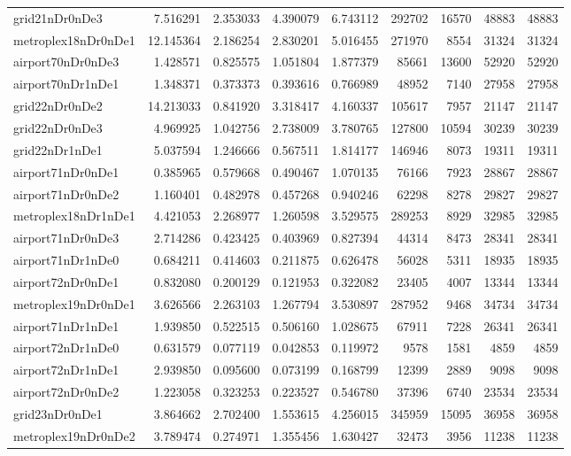\begin{longtable}{|l|r|r|r|r|r|r|r|r|}
grid21nDr0nDe3 & 7.516291 & 2.353033 & 4.390079 & 6.743112 & 292702 & 16570 & 48883 & 48883 \\
metroplex18nDr0nDe1 & 12.145364 & 2.186254 & 2.830201 & 5.016455 & 271970 & 8554 & 31324 & 31324 \\
airport70nDr0nDe3 & 1.428571 & 0.825575 & 1.051804 & 1.877379 & 85661 & 13600 & 52920 & 52920 \\
airport70nDr1nDe1 & 1.348371 & 0.373373 & 0.393616 & 0.766989 & 48952 & 7140 & 27958 & 27958 \\
grid22nDr0nDe2 & 14.213033 & 0.841920 & 3.318417 & 4.160337 & 105617 & 7957 & 21147 & 21147 \\
grid22nDr0nDe3 & 4.969925 & 1.042756 & 2.738009 & 3.780765 & 127800 & 10594 & 30239 & 30239 \\
grid22nDr1nDe1 & 5.037594 & 1.246666 & 0.567511 & 1.814177 & 146946 & 8073 & 19311 & 19311 \\
airport71nDr0nDe1 & 0.385965 & 0.579668 & 0.490467 & 1.070135 & 76166 & 7923 & 28867 & 28867 \\
airport71nDr0nDe2 & 1.160401 & 0.482978 & 0.457268 & 0.940246 & 62298 & 8278 & 29827 & 29827 \\
metroplex18nDr1nDe1 & 4.421053 & 2.268977 & 1.260598 & 3.529575 & 289253 & 8929 & 32985 & 32985 \\
airport71nDr0nDe3 & 2.714286 & 0.423425 & 0.403969 & 0.827394 & 44314 & 8473 & 28341 & 28341 \\
airport71nDr1nDe0 & 0.684211 & 0.414603 & 0.211875 & 0.626478 & 56028 & 5311 & 18935 & 18935 \\
airport72nDr0nDe1 & 0.832080 & 0.200129 & 0.121953 & 0.322082 & 23405 & 4007 & 13344 & 13344 \\
metroplex19nDr0nDe1 & 3.626566 & 2.263103 & 1.267794 & 3.530897 & 287952 & 9468 & 34734 & 34734 \\
airport71nDr1nDe1 & 1.939850 & 0.522515 & 0.506160 & 1.028675 & 67911 & 7228 & 26341 & 26341 \\
airport72nDr1nDe0 & 0.631579 & 0.077119 & 0.042853 & 0.119972 & 9578 & 1581 & 4859 & 4859 \\
airport72nDr1nDe1 & 2.939850 & 0.095600 & 0.073199 & 0.168799 & 12399 & 2889 & 9098 & 9098 \\
airport72nDr0nDe2 & 1.223058 & 0.323253 & 0.223527 & 0.546780 & 37396 & 6740 & 23534 & 23534 \\
grid23nDr0nDe1 & 3.864662 & 2.702400 & 1.553615 & 4.256015 & 345959 & 15095 & 36958 & 36958 \\
metroplex19nDr0nDe2 & 3.789474 & 0.274971 & 1.355456 & 1.630427 & 32473 & 3956 & 11238 & 11238 \\

\end{longtable}
